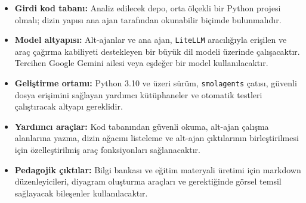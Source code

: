 \begin{itemize}
    \item \textbf{Girdi kod tabanı:} Analiz edilecek depo, orta ölçekli bir Python projesi olmalı; dizin yapısı ana ajan tarafından okunabilir biçimde bulunmalıdır.
    \item \textbf{Model altyapısı:} Alt-ajanlar ve ana ajan, \texttt{LiteLLM} aracılığıyla erişilen ve araç çağırma kabiliyeti destekleyen bir büyük dil modeli üzerinde çalışacaktır. Tercihen Google Gemini ailesi veya eşdeğer bir model kullanılacaktır.
    \item \textbf{Geliştirme ortamı:} Python 3.10 ve üzeri sürüm, \texttt{smolagents} çatısı, güvenli dosya erişimini sağlayan yardımcı kütüphaneler ve otomatik testleri çalıştıracak altyapı gereklidir.
    \item \textbf{Yardımcı araçlar:} Kod tabanından güvenli okuma, alt-ajan çalışma alanlarına yazma, dizin ağacını listeleme ve alt-ajan çıktılarının birleştirilmesi için özelleştirilmiş araç fonksiyonları sağlanacaktır.
    \item \textbf{Pedagojik çıktılar:} Bilgi bankası ve eğitim materyali üretimi için markdown düzenleyicileri, diyagram oluşturma araçları ve gerektiğinde görsel temsil sağlayacak bileşenler kullanılacaktır.
\end{itemize}